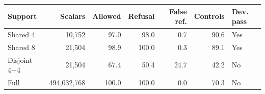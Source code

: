 \begin{tabular}{lrrrrrl}
\toprule
Support & Scalars & Allowed & Refusal & False ref. & Controls & Dev. pass \\
\midrule
Shared 4 & 10,752 & 97.0 & 98.0 & 0.7 & 90.6 & Yes \\
Shared 8 & 21,504 & 98.9 & 100.0 & 0.3 & 89.1 & Yes \\
Disjoint 4+4 & 21,504 & 67.4 & 50.4 & 24.7 & 42.2 & No \\
Full & 494,032,768 & 100.0 & 100.0 & 0.0 & 70.3 & No \\
\bottomrule
\end{tabular}
